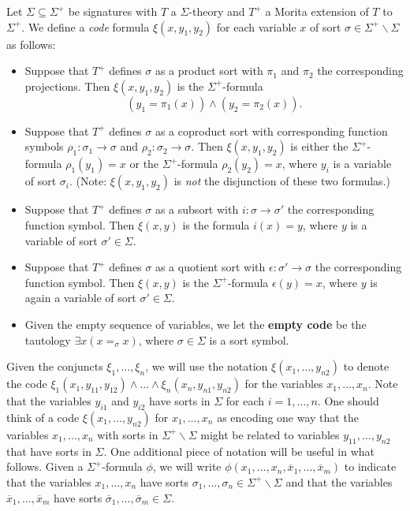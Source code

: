 \begin{defn} Let $\Sigma\subseteq\Sigma^+$ be signatures with $T$ a
  $\Sigma$-theory and $T^+$ a Morita extension of $T$ to $\Sigma^+$.
  We define a \emph{code} formula $\xi (x,y_1,y_2)$ for each variable
  $x$ of sort $\sigma\in\Sigma^+\backslash\Sigma$ as follows:
  \begin{itemize}
  \item Suppose that $T^+$ defines $\sigma$ as a product sort with
    $\pi_1$ and $\pi_2$ the corresponding projections.  Then
    $\xi (x,y_1,y_2)$ is the $\Sigma ^+$-formula
    \[ (y_1=\pi _1(x))\wedge (y_2=\pi _2(x)) .\]
  \item Suppose that $T^+$ defines $\sigma$ as a coproduct sort with
    corresponding function symbols $\rho_1:\sigma _1\to\sigma$ and
    $\rho_2:\sigma _2\to\sigma$.  Then $\xi (x,y_1,y_2)$ is either the
    $\Sigma^+$-formula $\rho_1(y_1)=x$ or the $\Sigma^+$-formula
    $\rho_2(y_2)=x$, where $y_i$ is a variable of sort $\sigma _i$.
    (Note: $\xi (x,y_1,y_2)$ is {\it not} the disjunction of these two
    formulas.)
  \item Suppose that $T^+$ defines $\sigma$ as a subsort with
    $i:\sigma\to\sigma '$ the corresponding function symbol.  Then
    $\xi (x,y)$ is the formula $i(x)=y$, where $y$ is a variable of
    sort $\sigma '\in\Sigma$.
  \item Suppose that $T^+$ defines $\sigma$ as a quotient sort with
    $\epsilon :\sigma '\rightarrow\sigma$ the corresponding function
    symbol. Then $\xi (x,y)$ is the $\Sigma^+$-formula
    $\epsilon(y)=x$, where $y$ is again a variable of sort
    $\sigma '\in\Sigma$.
  \item Given the empty sequence of variables, we let the
    \textbf{empty code} be the tautology $\exists x(x=_\sigma x)$,
    where $\sigma\in\Sigma$ is a sort symbol.
  \end{itemize}

  Given the conjuncts $\xi _1,\dots ,\xi _n$, we will use the notation
  $\xi(x_1, \ldots, y_{n2})$ to denote the code
  $\xi_1(x_1,y_{11}, y_{12})\land\ldots\land\xi_n(x_n, y_{n1},
  y_{n2})$ for the variables $x_1,\ldots, x_n$.  Note that the
  variables $y_{i1}$ and $y_{i2}$ have sorts in $\Sigma$ for each
  $i=1,\ldots, n$. One should think of a code
  $\xi(x_1,\ldots, y_{n2})$ for $x_1,\ldots, x_n$ as encoding one way
  that the variables $x_1,\ldots, x_n$ with sorts in
  $\Sigma^+\backslash\Sigma$ might be related to variables
  $y_{11}, \ldots, y_{n2}$ that have sorts in $\Sigma$. One additional
  piece of notation will be useful in what follows. Given a
  $\Sigma^+$-formula $\phi$, we will write
  $\phi(x_1,\ldots, x_n, \overline{x}_1, \ldots, \overline{x}_m)$ to
  indicate that the variables $x_1,\ldots, x_n$ have sorts
  $\sigma_1,\ldots, \sigma_n\in\Sigma^+\backslash\Sigma$ and that the
  variables $\overline{x}_1,\ldots, \overline{x}_m$ have sorts
  $\overline{\sigma}_1,\ldots,
  \overline{\sigma}_m\in\Sigma$. \end{defn}


